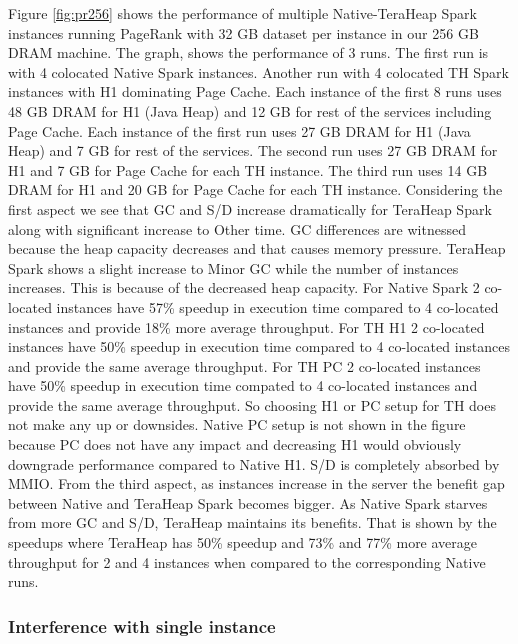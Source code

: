 Figure \ref{fig:pr256} shows the performance of multiple
Native-TeraHeap Spark instances running PageRank with 32 GB
dataset per instance in our 256 GB DRAM machine.
The graph, shows the
performance of 3 runs. The first run is with 4 colocated Native Spark instances.
Another run with 4 colocated TH Spark instances with H1 dominating Page Cache.
Each instance of the first 8 runs uses 48 GB DRAM for H1 (Java Heap) and 12 GB for rest of the services including Page Cache.
Each instance of the first run uses 27 GB DRAM for H1 (Java Heap) and 7 GB for rest of the services.
The second run uses 27 GB DRAM for H1 and 7 GB for Page Cache for each TH instance.
The third run uses 14 GB DRAM for H1 and 20 GB for Page Cache for each TH instance.
Considering the first aspect we see that GC and S/D increase dramatically for TeraHeap Spark along with significant increase to Other time. GC differences are witnessed because the heap capacity decreases and that causes memory pressure. TeraHeap Spark shows a slight increase to Minor GC while the number of instances increases. This is because of the decreased heap capacity. For Native Spark 2 co-located instances have 57\% speedup in execution time compared to 4 co-located instances and provide 18\% more average throughput. For TH H1 2 co-located instances have 50\% speedup in execution time compared to 4 co-located instances and provide the same average throughput. For TH PC 2 co-located instances have 50\% speedup in execution time compated to 4 co-located instances and provide the same average throughput. So choosing H1 or PC setup for TH does not make any up or downsides. Native PC setup is not shown in the figure because PC does not have any impact and decreasing H1 would obviously downgrade performance compared to Native H1.
S/D is completely absorbed by MMIO. From the third aspect, as instances increase in the server the benefit gap between Native and TeraHeap Spark becomes bigger. As Native Spark starves from more GC and S/D, TeraHeap maintains its benefits. That is shown by the speedups where TeraHeap has 50\% speedup and 73\% and 77\% more average throughput for 2 and 4 instances when compared to the corresponding Native runs.
\fi

\subsubsection{Interference with single instance}

